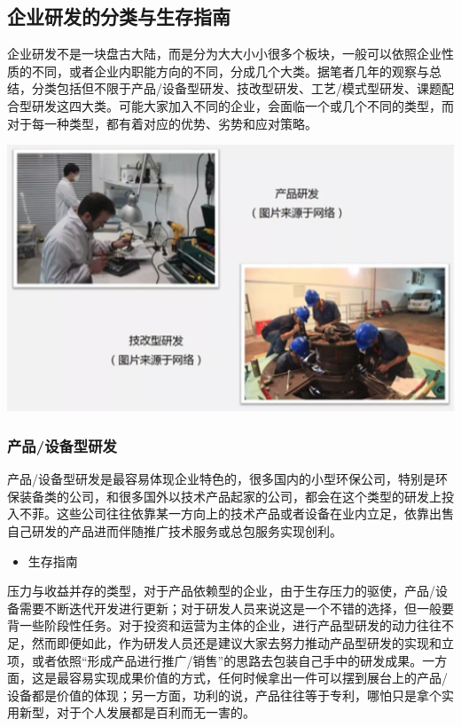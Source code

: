 \documentclass[]{book}
\providecommand{\tightlist}{%
  \setlength{\itemsep}{0pt}\setlength{\parskip}{0pt}}
\begin{document}
\hypertarget{ux4f01ux4e1aux7814ux53d1ux7684ux5206ux7c7bux4e0eux751fux5b58ux6307ux5357}{%
\subsection{企业研发的分类与生存指南}\label{ux4f01ux4e1aux7814ux53d1ux7684ux5206ux7c7bux4e0eux751fux5b58ux6307ux5357}}

企业研发不是一块盘古大陆，而是分为大大小小很多个板块，一般可以依照企业性质的不同，或者企业内职能方向的不同，分成几个大类。据笔者几年的观察与总结，分类包括但不限于产品/设备型研发、技改型研发、工艺/模式型研发、课题配合型研发这四大类。可能大家加入不同的企业，会面临一个或几个不同的类型，而对于每一种类型，都有着对应的优势、劣势和应对策略。

\includegraphics[width=6.67in]{images/qiye5}

\hypertarget{ux4ea7ux54c1ux8bbeux5907ux578bux7814ux53d1}{%
\subsubsection{产品/设备型研发}\label{ux4ea7ux54c1ux8bbeux5907ux578bux7814ux53d1}}

产品/设备型研发是最容易体现企业特色的，很多国内的小型环保公司，特别是环保装备类的公司，和很多国外以技术产品起家的公司，都会在这个类型的研发上投入不菲。这些公司往往依靠某一方向上的技术产品或者设备在业内立足，依靠出售自己研发的产品进而伴随推广技术服务或总包服务实现创利。

\begin{itemize}
\tightlist
\item
  生存指南
\end{itemize}

压力与收益并存的类型，对于产品依赖型的企业，由于生存压力的驱使，产品/设备需要不断迭代开发进行更新；对于研发人员来说这是一个不错的选择，但一般要背一些阶段性任务。对于投资和运营为主体的企业，进行产品型研发的动力往往不足，然而即便如此，作为研发人员还是建议大家去努力推动产品型研发的实现和立项，或者依照``形成产品进行推广/销售''的思路去包装自己手中的研发成果。一方面，这是最容易实现成果价值的方式，任何时候拿出一件可以摆到展台上的产品/设备都是价值的体现；另一方面，功利的说，产品往往等于专利，哪怕只是拿个实用新型，对于个人发展都是百利而无一害的。
\end{document}
